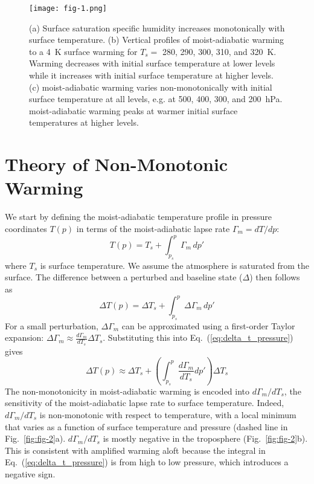 \documentclass[]{ametsocV6.1}
\begin{document}
\begin{figure}[htbp]
 \centering
 \texttt{[image: fig-1.png]}\\
\caption{(a) Surface saturation specific humidity increases monotonically with surface temperature. (b) Vertical profiles of moist-adiabatic warming to a 4~K surface warming for $T_s = $ 280, 290, 300, 310, and 320~K. Warming decreases with initial surface temperature at lower levels while it increases with initial surface temperature at higher levels. (c) moist-adiabatic warming varies non-monotonically with initial surface temperature at all levels, e.g. at 500, 400, 300, and 200~hPa. moist-adiabatic warming peaks at warmer initial surface temperatures at higher levels.}
\label{fig:fig-1}
\end{figure}

\section{Theory of Non-Monotonic Warming}
We start by defining the moist-adiabatic temperature profile in pressure coordinates $T(p)$ in terms of the moist-adiabatic lapse rate $\Gamma_m = dT/dp$:
\begin{equation}
T(p) = T_s + \int_{p_s}^{p} \Gamma_m \, dp' \label{eq:temp_profile_pressure}
\end{equation}
where $T_s$ is surface temperature. We assume the atmosphere is saturated from the surface. The difference between a perturbed and baseline state ($\Delta$) then follows as
\begin{equation}
\Delta T(p) = \Delta T_s + \int_{p_s}^{p} \Delta\Gamma_m \, dp' \label{eq:delta_t_pressure}
\end{equation}
For a small perturbation, $\Delta \Gamma_m$ can be approximated using a first-order Taylor expansion: $\Delta\Gamma_m \approx \frac{d\Gamma_m}{dT_s}\Delta T_s$. Substituting this into Eq.~(\ref{eq:delta_t_pressure}) gives
\begin{equation}
\Delta T(p) \approx \Delta T_s + \left(\int_{p_s}^{p} \frac{d\Gamma_m}{dT_s}dp'\right)\Delta T_s \label{eq:delta_t_taylor_pressure}
\end{equation}
The non-monotonicity in moist-adiabatic warming is encoded into $d\Gamma_m/dT_s$, the sensitivity of the moist-adiabatic lapse rate to surface temperature. Indeed, $d\Gamma_m/dT_s$ is non-monotonic with respect to temperature, with a local minimum that varies as a function of surface temperature and pressure (dashed line in Fig.~\ref{fig:fig-2}a). $d\Gamma_m/dT_s$ is mostly negative in the troposphere (Fig.~\ref{fig:fig-2}b). This is consistent with amplified warming aloft because the integral in Eq.~(\ref{eq:delta_t_pressure}) is from high to low pressure, which introduces a negative sign.
\end{document}
